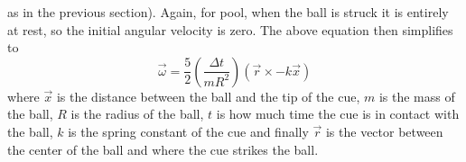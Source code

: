 \documentclass[12pt]{article}
\begin{document}
            as in the previous section). Again, for pool, when the ball is struck it is entirely at rest, so the initial angular velocity is zero.
            The above equation then simplifies to
            \begin{equation}
                \vec \omega = \frac{5}{2} \left(\frac{\Delta t}{m R^2}\right) (\vec r \times -k \vec x)
                \label{equ:shot_angular}
            \end{equation}
            where $\vec x$ is the distance between the ball and the tip of the cue, $m$ is the mass of the ball, $R$ is the radius of the ball,
            $t$ is how much time the cue is in contact with the ball, $k$ is the spring constant of the cue and finally $\vec r$ is the vector
            between the center of the ball and where the cue strikes the ball.
        
\end{document}
